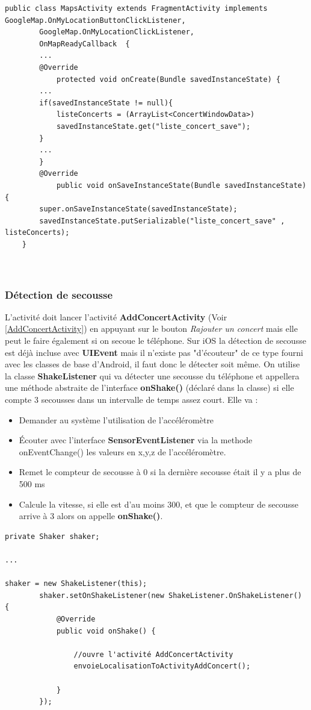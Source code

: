 \documentclass{article}
\begin{document}
\begin{verbatim}
public class MapsActivity extends FragmentActivity implements GoogleMap.OnMyLocationButtonClickListener,
        GoogleMap.OnMyLocationClickListener,
        OnMapReadyCallback  {
		...
		@Override
    		protected void onCreate(Bundle savedInstanceState) {
		...
		if(savedInstanceState != null){
            listeConcerts = (ArrayList<ConcertWindowData>)
            savedInstanceState.get("liste_concert_save");   
        }
        ...
        }
        @Override
    		public void onSaveInstanceState(Bundle savedInstanceState) {
        super.onSaveInstanceState(savedInstanceState);
        savedInstanceState.putSerializable("liste_concert_save" , listeConcerts);
    }
		        
        
\end{verbatim}

\subsubsection{Détection de secousse}
\label{subsubsection:secousse}
L'activité doit lancer l'activité \textbf{AddConcertActivity} (Voir \ref{AddConcertActivity}) en appuyant sur le bouton \textit{Rajouter un concert} mais elle peut le faire également si on secoue le téléphone. Sur iOS la détection de secousse est déjà incluse avec \textbf{UIEvent} mais il n'existe pas "d'écouteur" de ce type fourni avec les classes de base d'Android, il faut donc le détecter soit même. 
\vspace{1\baselineskip}
On utilise la classe \textbf{ShakeListener} qui va détecter une secousse du téléphone et appellera une méthode abstraite de l'interface  \textbf{onShake()} (déclaré dans la classe) si elle compte 3 secousses dans un intervalle de temps assez court. Elle va : 
\begin{itemize}
\item Demander au système l'utilisation de l'accéléromètre 
\item Écouter avec l'interface \textbf{SensorEventListener} via la methode onEventChange() les valeurs en x,y,z de l'accéléromètre.
\item Remet le compteur de secousse à 0 si la dernière secousse était il y a plus de 500 ms 
\item Calcule la vitesse, si elle est d'au moins 300, et que le compteur de secousse arrive à 3 alors on appelle \textbf{onShake()}.
\end{itemize}

\begin{verbatim}
private Shaker shaker; 

...

shaker = new ShakeListener(this);
        shaker.setOnShakeListener(new ShakeListener.OnShakeListener() {
            @Override
            public void onShake() {
				
				//ouvre l'activité AddConcertActivity
                envoieLocalisationToActivityAddConcert();

            }
        });
\end{verbatim}
\end{document}
